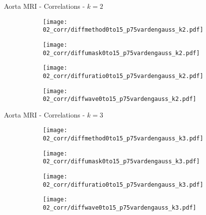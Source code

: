\documentclass{beamer}
\begin{document}
\begin{frame}{Aorta MRI - Correlations - $k=2$}{}
\begin{figure}
\centering
\begin{subfigure}{0.24\textwidth}
\texttt{[image: 02\_corr/diffmethod0to15\_p75vardengauss\_k2.pdf]}
\end{subfigure}
\begin{subfigure}{0.24\textwidth}
\texttt{[image: 02\_corr/diffumask0to15\_p75vardengauss\_k2.pdf]}
\end{subfigure}
\begin{subfigure}{0.24\textwidth}
\texttt{[image: 02\_corr/diffuratio0to15\_p75vardengauss\_k2.pdf]}
\end{subfigure}
\begin{subfigure}{0.24\textwidth}
\texttt{[image: 02\_corr/diffwave0to15\_p75vardengauss\_k2.pdf]}
\end{subfigure}
\end{figure}
\end{frame}

\begin{frame}{Aorta MRI - Correlations - $k=3$}{}
\begin{figure}
\centering
\begin{subfigure}{0.24\textwidth}
\texttt{[image: 02\_corr/diffmethod0to15\_p75vardengauss\_k3.pdf]}
\end{subfigure}
\begin{subfigure}{0.24\textwidth}
\texttt{[image: 02\_corr/diffumask0to15\_p75vardengauss\_k3.pdf]}
\end{subfigure}
\begin{subfigure}{0.24\textwidth}
\texttt{[image: 02\_corr/diffuratio0to15\_p75vardengauss\_k3.pdf]}
\end{subfigure}
\begin{subfigure}{0.24\textwidth}
\texttt{[image: 02\_corr/diffwave0to15\_p75vardengauss\_k3.pdf]}
\end{subfigure}
\end{figure}
\end{frame}
\end{document}
